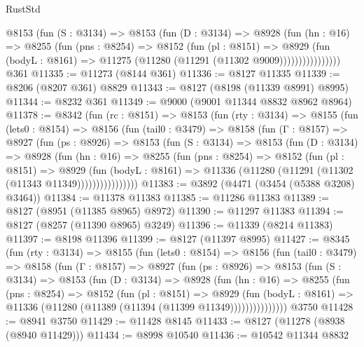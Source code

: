 \begin{lexlean}{RustStd}
\begin{coremodule}
                @8153
                  (fun (S : @3134) =>
                  @8153
                    (fun (D : @3134) =>
                    @8928
                      (fun (hn : @16) =>
                      @8255
                        (fun (pns : @8254) =>
                        @8152
                          (fun (pl : @8151) =>
                          @8929
                            (fun (bodyL : @8161) =>
                            @11275 (@11280 (@11291 (@11302 @9009))))))))))))))))
    @361
@11335 := @11273 (@8144 @361)
@11336 := @8127 @11335
@11339 := @8206 (@8207 @361) @8829
@11343 := @8127 (@8198 (@11339 @8991) @8995)
@11344 := @8232 @361
@11349 := @9000 (@9001 @11344 @8832 @8962 @8964)
@11378 := @8342
    (fun (rc : @8151) =>
    @8153
      (fun (rty : @3134) =>
      @8155
        (fun (lets0 : @8154) =>
        @8156
          (fun (tail0 : @3479) =>
          @8158
            (fun (Γ : @8157) =>
            @8927
              (fun (ps : @8926) =>
              @8153
                (fun (S : @3134) =>
                @8153
                  (fun (D : @3134) =>
                  @8928
                    (fun (hn : @16) =>
                    @8255
                      (fun (pns : @8254) =>
                      @8152
                        (fun (pl : @8151) =>
                        @8929
                          (fun (bodyL : @8161) =>
                          @11336 (@11280 (@11291 (@11302 (@11343 @11349))))))))))))))))
@11383 := @3892 (@4471 (@3454 (@5388 @3208) @3464))
@11384 := @11378 @11383
@11385 := @11286 @11383
@11389 := @8127 (@8951 (@11385 @8965) @8972)
@11390 := @11297 @11383
@11394 := @8127 (@8257 (@11390 @8965) @3249)
@11396 := @11339 (@8214 @11383)
@11397 := @8198 @11396
@11399 := @8127 (@11397 @8995)
@11427 := @8345
    (fun (rty : @3134) =>
    @8155
      (fun (lets0 : @8154) =>
      @8156
        (fun (tail0 : @3479) =>
        @8158
          (fun (Γ : @8157) =>
          @8927
            (fun (ps : @8926) =>
            @8153
              (fun (S : @3134) =>
              @8153
                (fun (D : @3134) =>
                @8928
                  (fun (hn : @16) =>
                  @8255
                    (fun (pns : @8254) =>
                    @8152
                      (fun (pl : @8151) =>
                      @8929
                        (fun (bodyL : @8161) =>
                        @11336 (@11280 (@11389 (@11394 (@11399 @11349)))))))))))))))
    @3750
@11428 := @8941 @3750
@11429 := @11428 @8145
@11433 := @8127 (@11278 (@8938 (@8940 @11429)))
@11434 := @8998 @10540
@11436 := @10542 @11344 @8832

\end{coremodule}
\end{lexlean}
